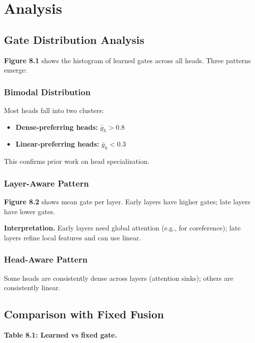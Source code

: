 
\section{Analysis}

\subsection{Gate Distribution Analysis}

\textbf{Figure 8.1} shows the histogram of learned gates across all heads. Three 
patterns emerge:

\subsubsection{Bimodal Distribution}

Most heads fall into two clusters:

\begin{itemize}
\item \textbf{Dense-preferring heads:} $\bar{g}_h > 0.8$
\item \textbf{Linear-preferring heads:} $\bar{g}_h < 0.3$

\end{itemize}
This confirms prior work on head specialization.

\subsubsection{Layer-Aware Pattern}

\textbf{Figure 8.2} shows mean gate per layer. Early layers have higher gates; 
late layers have lower gates.

\textbf{Interpretation.} Early layers need global attention (e.g., for 
coreference); late layers refine local features and can use linear.

\subsubsection{Head-Aware Pattern}

Some heads are consistently dense across layers (attention sinks); others 
are consistently linear.

\subsection{Comparison with Fixed Fusion}

\textbf{Table 8.1: Learned vs fixed gate.}

